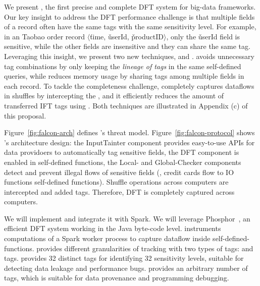 We present \kakute, the first precise and complete DFT system for big-data 
frameworks. Our key insight to address the DFT performance challenge is that 
multiple fields of a record often have the same tags with the same sensitivity 
level. For example, in an Taobao order record $\langle$\v{time}, 
\v{userId}, \v{productID}$\rangle$, only the \v{userId} field is 
sensitive, while the other fields are insensitive and they can share the same 
tag. Leveraging this insight, we present two new techniques, \lazyp and 
\tagcache. \lazyp avoids unnecessary tag combinations by only keeping the 
\textit{lineage of tags} in the same self-defined queries, while \tagcache 
reduces memory usage by sharing tags among multiple fields in each record. To 
tackle the completeness challenge, \kakute completely captures dataflows in 
shuffles by intercepting the , and it efficiently reduces the amount of 
transferred IFT tags using \tagcache. Both techniques are illustrated in 
Appendix (c) of this proposal.

Figure~\ref{fig:falcon-arch} defines \kakute's threat 
model. Figure~\ref{fig:falcon-protocol} shows \kakute's architecture 
design: the InputTainter component provides easy-to-use APIs for 
data providoers to automatically tag sensitive fields, the DFT component is 
enabled in self-defined functions, the Local- and Global-Checker components 
detect and prevent illegal flows of sensitive fields (\eg, credit cards flow to 
IO functions self-defined functions). Shuffle operations across computers are 
intercepted and added tags. Therefore, DFT is completely captured across 
computers.

We will implement \kakute and integrate it with Spark. We will leverage 
Phosphor~\cite{oo14:phosphor}, an efficient DFT system working in the Java 
byte-code level. \kakute instruments computations of a Spark worker process
to capture dataflow inside self-defined-functions. \kakute provides different 
granularities of tracking with two types of tags: 
and  tags.  provides 32 distinct tags for 
identifying 32 sensitivity levels, suitable for detecting data leakage and 
performance bugs.  provides an arbitrary number of tags, which is 
suitable for data provenance and programming debugging.

